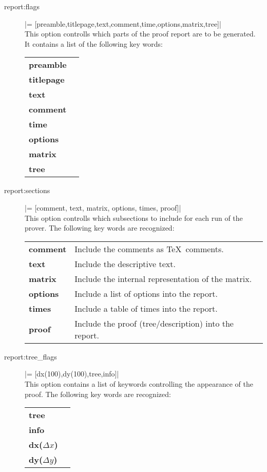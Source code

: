 \begin{description}
  \item [report:flags] |= [preamble,titlepage,text,comment,time,options,matrix,tree]|\\
  This option controlls which parts of the proof report are to be generated.
  It contains a list of the following key words:

  \def\X[#1]{{\bf #1}&}
  \begin{tabular}{lp{}}
    \X[preamble]                \\
    \X[titlepage]               \\
    \X[text]            \\
    \X[comment]         \\
    \X[time]            \\
    \X[options]         \\
    \X[matrix]          \\
    \X[tree]
  \end{tabular}

  \item [report:sections] |= [comment, text, matrix, options, times, proof]|\\
  This option controlls which subsections to include for each run of the
  prover. The following key words are recognized:

  \begin{tabular}{lp{}}
    \X[comment] Include the comments as \TeX\ comments. \\
    \X[text]    Include the descriptive text. \\
    \X[matrix]  Include the internal representation of the matrix. \\
    \X[options] Include a list of options into the report. \\
    \X[times]   Include a table of times into the report. \\
    \X[proof]   Include the proof (tree/description) into the report.
  \end{tabular}

  \item [report:tree\_flags] |= [dx(100),dy(100),tree,info]|\\
  This option contains a list of keywords controlling the appearance of the
  proof. The following key words are recognized:

  \begin{tabular}{lp{}}
    \X[tree]            \\
    \X[info]            \\
    \X[dx($\Delta x$)]          \\
    \X[dy($\Delta y$)]
  \end{tabular}

\end{description}


